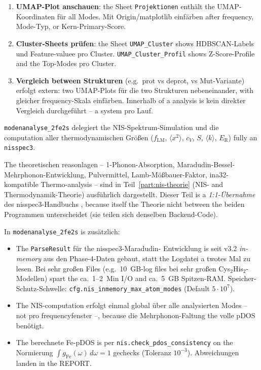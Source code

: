 \documentclass[11pt,a4paper,twoside]{article}
\newcommand{\fLM}{f_{\mathrm{LM}}}
\newcommand{\ER}{E_{\mathrm{R}}}
\newcommand{\Fei}{\mathrm{Fe}}
\theoremstyle{remark}
\begin{document}
\begin{enumerate}
  \item \textbf{UMAP-Plot anschauen}: the Sheet
        \texttt{Projektionen} enth\"alt the UMAP-Koordinaten f\"ur
        all Modes. Mit Origin/matplotlib einf\"arben after frequency,
        Mode-Typ, or Kern-Primary-Score.

  \item \textbf{Cluster-Sheets pr\"ufen}: the Sheet
        \texttt{UMAP\_Cluster} shows HDBSCAN-Labels und
        Feature-valuee pro Cluster. \texttt{UMAP\_Cluster\_Profil}
        shows Z-Score-Profile and the Top-Modes pro Cluster.

  \item \textbf{Vergleich between Strukturen} (e.g.\ prot vs deprot,
        vs Mut-Variante) erfolgt extern: two UMAP-Plots f\"ur die
        two Strukturen nebeneinander, with gleicher frequency-Skala
        einf\"arben. Innerhalb of a analysis is kein direkter
        Vergleich durchgef\"uhrt -- a system pro Lauf.
\end{enumerate}




\label{sec:nis}

\texttt{modenanalyse\_2fe2s} delegiert the NIS-Spektrum-Simulation und
die computation aller thermodynamischen Gr\"o\ss en
($\fLM$, $\langle x^2\rangle$, $c_V$, $S$, $\langle k\rangle$,
$\ER$) fully an \texttt{nisspec3}.

The theoretischen reasonlagen -- 1-Phonon-Absorption,
Maradudin-Bessel-Mehrphonon-Entwicklung, Pulvermittel,
Lamb-M\"o\ss bauer-Faktor, ina32-kompatible Thermo-analysis -- sind
in Teil~\ref{part:nis-theorie} (NIS- and Thermodynamik-Theorie)
ausf\"uhrlich dargestellt. Dieser Teil is a \emph{1:1-\"Ubernahme}
des nisspec3-Handbuchs \cite{NisspecHandbuch}, because itself the Theorie
nicht between the beiden Programmen unterscheidet (sie teilen sich
denselben Backend-Code).

In \texttt{modenanalyse\_2fe2s} is zus\"atzlich:
\begin{itemize}
  \item The \texttt{ParseResult} f\"ur the nisspec3-Maradudin-
        Entwicklung is seit v3.2 \emph{in-memory} aus den
        Phase-4-Daten gebaut, statt the Logdatei a twotes Mal zu
        lesen. Bei sehr gro\ss en Files (e.g.\ 10~GB-log files bei sehr gro\ss en Cys$_2$His$_2$-Modellen)
        spart the ca.\ 1--2~Min I/O and ca.\ 5~GB Spitzen-RAM.
        Speicher-Schutz-Schwelle: \texttt{cfg.nis\_inmemory\_max\_atom\_modes}
        (Default $5\cdot 10^7$).
  \item The NIS-computation erfolgt einmal global \"uber alle
        analysierten Modes -- not pro frequencyfenster --, because die
        Mehrphonon-Faltung the volle pDOS ben\"otigt.
  \item The berechnete Fe-pDOS is per
        \texttt{nis.check\_pdos\_consistency} on the Normierung
        $\int g_\Fei(\omega)\,d\omega = 1$ gechecks (Toleranz
        $10^{-3}$). Abweichungen landen in the REPORT.
\end{itemize}
\end{document}
